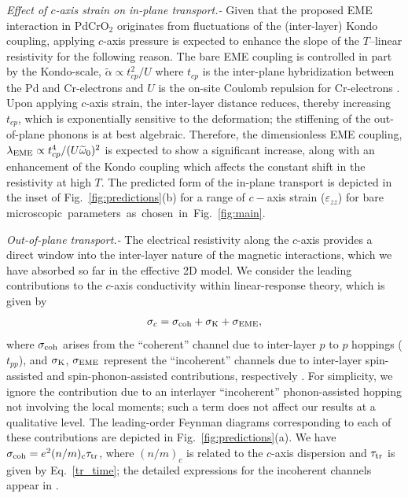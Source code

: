 \documentclass[aps,prl,twocolumn,superscriptaddress,amsmath,nofootinbib,10pt,floatfix]{revtex4-2}
\begin{document}
\textit{Effect of $c$-axis strain on in-plane transport.-} Given that the proposed EME interaction in PdCrO$_2$ originates from fluctuations of the (inter-layer) Kondo coupling, applying $c$-axis pressure is expected to enhance the slope of the $T$--linear resistivity for the following reason. The bare EME coupling is controlled in part by the Kondo-scale, $\widetilde{\alpha}\propto t_{cp}^2/U$ where $t_{cp}$ is the inter-plane hybridization between the Pd and Cr-electrons and $U$ is the on-site Coulomb repulsion for Cr-electrons \cite{sunko_probing_2020,Supplementary_material}. Upon applying $c$-axis strain, the inter-layer distance reduces, thereby increasing $t_{cp}$, which is exponentially sensitive to the deformation; the stiffening of the out-of-plane phonons is at best algebraic. Therefore, the dimensionless EME coupling, $\lambda_{\rm EME}\propto t^4_{cp}/(U\widetilde{\omega}_0)^2$ is expected to show a significant increase, along with an enhancement of the Kondo coupling which affects the constant shift in the resistivity at high $T$. The predicted form of the in-plane transport is depicted in the inset of Fig.~\ref{fig:predictions}(b) for a range of $c-$axis strain ($\varepsilon_{zz}$) for bare microscopic~parameters~as~chosen~in~Fig.~\ref{fig:main}. 


\textit{Out-of-plane transport.-} The electrical resistivity along the $c$-axis provides a direct window into the inter-layer nature of the magnetic interactions, which we have absorbed so far in the effective 2D model. We consider the leading contributions to the $c$-axis conductivity within linear-response theory, which is given by 
\begin{eqnarray}
\sigma_c = \sigma_{\rm coh} + \sigma_{\rm K} + \sigma_{\rm EME},
\label{c_axis_cond_terms}
\end{eqnarray}
where $\sigma_{\rm coh}$ arises from the ``coherent'' channel due to inter-layer $p$ to $p$ hoppings ($t_{pp}$), and $\sigma_{\rm K}$, $\sigma_{\rm EME}$ represent the ``incoherent'' channels due to inter-layer spin-assisted and spin-phonon-assisted contributions, respectively \cite{Supplementary_material}. For simplicity, we ignore the contribution due to an interlayer ``incoherent'' phonon-assisted hopping not involving the local moments; such a term does not affect our results at a qualitative level. The leading-order Feynman diagrams corresponding to each of these contributions  are depicted in Fig.~\ref{fig:predictions}(a). We have $\sigma_{\rm coh} = e^2 (n/m)_c \tau_{\rm tr}$, where $(n/m)_c$ is related to the $c$-axis dispersion and $\tau_{\rm tr}$ is given by Eq.~\eqref{tr_time}; the detailed expressions for the incoherent channels appear in \cite{Supplementary_material}. 
\end{document}
